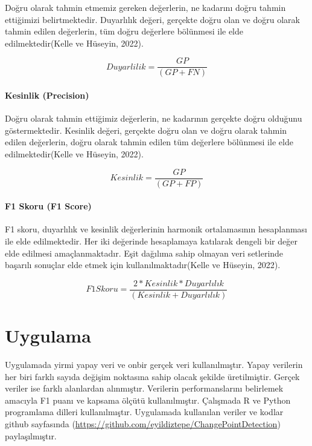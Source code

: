 \documentclass[12pt,twoside]{deuthesis}
\begin{document}
Doğru olarak tahmin etmemiz gereken değerlerin, ne kadarını doğru tahmin ettiğimizi belirtmektedir. Duyarlılık değeri, gerçekte doğru olan ve doğru olarak tahmin edilen değerlerin, tüm doğru değerlere bölünmesi ile elde edilmektedir(Kelle ve Hüseyin, 2022).

\[Duyarlilik =  \frac{GP}{(GP + FN)}\]

\hypertarget{kesinlik-precision}{%
\subsubsection{Kesinlik (Precision)}\label{kesinlik-precision}}

Doğru olarak tahmin ettiğimiz değerlerin, ne kadarının gerçekte doğru olduğunu göstermektedir. Kesinlik değeri, gerçekte doğru olan ve doğru olarak tahmin edilen değerlerin, doğru olarak tahmin edilen tüm değerlere bölünmesi ile elde edilmektedir(Kelle ve Hüseyin, 2022).

\[Kesinlik =  \frac{GP}{(GP + FP)}\]

\hypertarget{f1-skoru-f1-score}{%
\subsubsection{F1 Skoru (F1 Score)}\label{f1-skoru-f1-score}}

F1 skoru, duyarlılık ve kesinlik değerlerinin harmonik ortalamasının hesaplanması ile elde edilmektedir. Her iki değerinde hesaplamaya katılarak dengeli bir değer elde edilmesi amaçlanmaktadır. Eşit dağılıma sahip olmayan veri setlerinde başarılı sonuçlar elde etmek için kullanılmaktadır(Kelle ve Hüseyin, 2022).

\[ F1 Skoru = \frac{2 * Kesinlik * Duyarlılık}{(Kesinlik + Duyarlılık)} \]

\hypertarget{Bolum3}{%
\chapter{Uygulama}\label{Bolum3}}

Uygulamada yirmi yapay veri ve onbir gerçek veri kullanılmıştır. Yapay verilerin her biri farklı sayıda değişim noktasına sahip olacak şekilde üretilmiştir. Gerçek veriler ise farklı alanlardan alınmıştır. Verilerin performanslarını belirlemek amacıyla F1 puanı ve kapsama ölçütü kullanılmıştır. Çalışmada R ve Python programlama dilleri kullanılmıştır. Uygulamada kullanılan veriler ve kodlar github sayfasında (\url{https://github.com/eyildiztepe/ChangePointDetection}) paylaşılmıştır.
\end{document}
